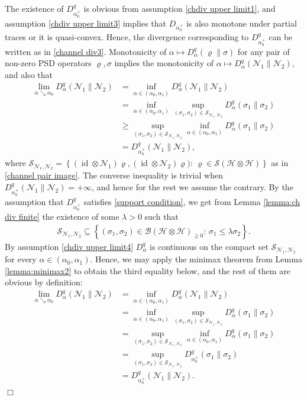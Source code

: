 \documentclass[unsortedaddress,superscriptaddress,pra,notitlepage]{revtex4}
\newenvironment{proof}[1][Proof]{\begin{trivlist}
\item[\hskip \labelsep {\bfseries #1}]}{\hfill$\Box$\end{trivlist}}
\def\B{{\mathcal B}}
\def\N{\mathcal{N}}
\def\S{{\mathcal S}}
\def\rho{\varrho}
\def\hil{{\mathcal H}}
\def\pne{_{\gneq 0}}
\def\cpso{\text{CPSO} }
\DeclareMathOperator{\id}{id}
\begin{document}
\begin{proof}
The existence of $D_{\alpha_0^+}^q$ is obvious from assumption \ref{chdiv upper limit1},
and assumption \ref{chdiv upper limit3} implies that 
$D_{\alpha_0^+}$ is also monotone under partial traces 
or it is quasi-convex. Hence, the \cpso divergence 
corresponding to $D_{\alpha_0^+}^q$ can be written as in \eqref{channel div3}.
Monotonicity of $\alpha\mapsto D_{\alpha}^q(\rho\|\sigma)$ for any pair of non-zero PSD operators
$\rho,\sigma$ implies the monotonicity of $\alpha\mapsto D_{\alpha}^q(\N_1\|\N_2)$, and also 
that 
\begin{align*}
\lim_{\alpha\searrow \alpha_0}D_{\alpha}^q(\N_1\|\N_2)
&=
\inf_{\alpha\in(\alpha_0,\alpha_1)}D_{\alpha}^q(\N_1\|\N_2)\\
&=
\inf_{\alpha\in(\alpha_0,\alpha_1)}\sup_{(\sigma_1,\sigma_2)\in\S_{\N_1,\N_2}}
D_{\alpha}^q(\sigma_1\|\sigma_2)\\
&\ge
\sup_{(\sigma_1,\sigma_2)\in\S_{\N_1,\N_2}}\inf_{\alpha\in(\alpha_0,\alpha_1)}
D_{\alpha}^q(\sigma_1\|\sigma_2)\\
&=
D_{\alpha_0^+}^q(\N_1\|\N_2),
\end{align*}
where $\S_{\N_1,\N_2}=\left\{(\id\otimes\N_1)\rho,(\id\otimes\N_2)\rho):\,\rho\in\S(\hil\otimes\hil)\right\}$ as in \eqref{channel pair image}.
The converse inequality is trivial when $D_{\alpha_0^+}^q(\N_1\|\N_2)=+\infty$, and hence for the 
rest we assume the contrary. 
By the assumption that $D_{\alpha_0^+}^q$ 
satisfies \eqref{support condition}, we get from Lemma \ref{lemma:ch div finite} the existence of some 
$\lambda>0$ such that 
\begin{align*}
\S_{\N_1,\N_2}
\subseteq
\left\{(\sigma_1,\sigma_2)\in\B(\hil\otimes\hil)\pne:\,\sigma_1\le\lambda\sigma_2\right\}.
\end{align*}
By assumption \ref{chdiv upper limit4} $D_{\alpha}^q$ is continuous on the compact set $\S_{\N_1,\N_2}$ for every $\alpha\in(\alpha_0,\alpha_1)$.
Hence, we may apply the minimax theorem from Lemma \ref{lemma:minimax2} to obtain 
the third equality below, and the rest of them are obvious by definition:
\begin{align*}
\lim_{\alpha\searrow \alpha_0}D_{\alpha}^q(\N_1\|\N_2)&=
\inf_{\alpha\in(\alpha_0,\alpha_1)}D_{\alpha}^q(\N_1\|\N_2)\\
&=
\inf_{\alpha\in(\alpha_0,\alpha_1)}\sup_{(\sigma_1,\sigma_2)\in\S_{\N_1,\N_2}}
D_{\alpha}^q(\sigma_1\|\sigma_2)\\
&=
\sup_{(\sigma_1,\sigma_2)\in\S_{\N_1,\N_2}}\inf_{\alpha\in(\alpha_0,\alpha_1)}
D_{\alpha}^q(\sigma_1\|\sigma_2)\\
&=
\sup_{(\sigma_1,\sigma_2)\in\S_{\N_1,\N_2}}
D_{\alpha_0^+}^q(\sigma_1\|\sigma_2)\\
&=
D_{\alpha_0^+}^q(\N_1\|\N_2).
\end{align*}
\end{proof}
\end{document}
